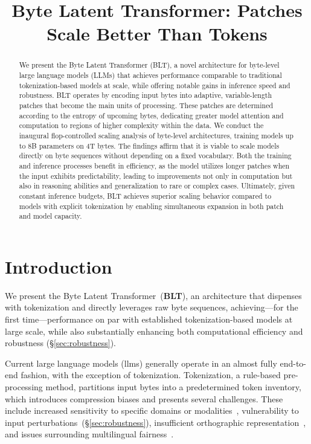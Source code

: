 \title{Byte Latent Transformer: Patches Scale Better Than Tokens}

\begin{abstract}
We present the Byte Latent Transformer (\textsc{BLT}), a novel architecture for byte-level large language models (LLMs) that achieves performance comparable to traditional tokenization-based models at scale, while offering notable gains in inference speed and robustness. \textsc{BLT} operates by encoding input bytes into adaptive, variable-length patches that become the main units of processing. These patches are determined according to the entropy of upcoming bytes, dedicating greater model attention and computation to regions of higher complexity within the data. We conduct the inaugural flop-controlled scaling analysis of byte-level architectures, training models up to 8B parameters on 4T bytes. The findings affirm that it is viable to scale models directly on byte sequences without depending on a fixed vocabulary. Both the training and inference processes benefit in efficiency, as the model utilizes longer patches when the input exhibits predictability, leading to improvements not only in computation but also in reasoning abilities and generalization to rare or complex cases. Ultimately, given constant inference budgets, \textsc{BLT} achieves superior scaling behavior compared to models with explicit tokenization by enabling simultaneous expansion in both patch and model capacity.
\end{abstract}

\section{Introduction}
\label{section:intro}

We present the Byte Latent Transformer~(\textbf{BLT}), an architecture that dispenses with tokenization and directly leverages raw byte sequences, achieving—for the first time—performance on par with established tokenization-based models at large scale, while also substantially enhancing both computational efficiency and robustness (\S\ref{sec:robustness}).

Current large language models (llms) generally operate in an almost fully end-to-end fashion, with the exception of tokenization. Tokenization, a rule-based pre-processing method, partitions input bytes into a predetermined token inventory, which introduces compression biases and presents several challenges. These include increased sensitivity to specific domains or modalities~\citep{dagangetting}, vulnerability to input perturbations~(\S\ref{sec:robustness}), insufficient orthographic representation~\citep{edman2024cute}, and issues surrounding multilingual fairness~\citep{liang2023xlm,petrov2024language,limisiewicz2024myte}.

